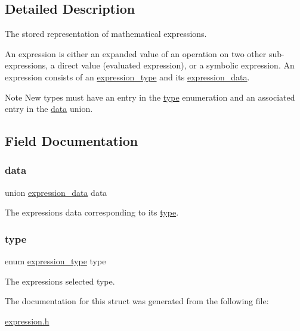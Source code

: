 \subsection{Detailed Description}
The stored representation of mathematical expressions. 

An expression is either an expanded value of an operation on two other sub-\/expressions, a direct value (evaluated expression), or a symbolic expression. An expression consists of an \hyperlink{expression_8h_a5a6601c4e142145f0e87051cb21ece0f}{expression\+\_\+type} and it\textquotesingle{}s \hyperlink{unionexpression__data}{expression\+\_\+data}.\begin{DoxyNote}{Note}
New types must have an entry in the \hyperlink{structexpression_a6c50b44c70231c1b3752f8516daa967c}{type} enumeration and an associated entry in the \hyperlink{structexpression_addb4bda6d311d21f3fd2bfdd12fc70ab}{data} union. 
\end{DoxyNote}


\subsection{Field Documentation}
\mbox{\label{structexpression_addb4bda6d311d21f3fd2bfdd12fc70ab}} 
\subsubsection{\texorpdfstring{data}{data}}
{\footnotesize\ttfamily union \hyperlink{unionexpression__data}{expression\+\_\+data} data}



The expression\textquotesingle{}s data corresponding to it\textquotesingle{}s \hyperlink{structexpression_a6c50b44c70231c1b3752f8516daa967c}{type}. 

\mbox{\label{structexpression_a6c50b44c70231c1b3752f8516daa967c}} 
\subsubsection{\texorpdfstring{type}{type}}
{\footnotesize\ttfamily enum \hyperlink{expression_8h_a5a6601c4e142145f0e87051cb21ece0f}{expression\+\_\+type} type}



The expression\textquotesingle{}s selected type. 



The documentation for this struct was generated from the following file\+:\begin{DoxyCompactItemize}
\item 
\hyperlink{expression_8h}{expression.\+h}\end{DoxyCompactItemize}
